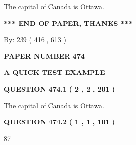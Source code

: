\documentclass[12pt]{article}
\begin{document}
 
\noindent{}
 
 
The capital of Canada is Ottawa.
 
 
 
 
   
   
 \vspace{0.2in}
 
   
   
   
   
\vspace{1.0in} 
{\textbf{\large{ *** END OF PAPER, THANKS *** }}} 
   
   
\hspace{1.0in} By: 
 239 ( 416 ,  613 )
   
   
   
   
\newpage 
\setcounter{page}{ 
   474001 } 
   
   
   
   
 {\textbf{ \Large{ PAPER NUMBER  474  }}}
   
   
\vspace{0.2in}
   
   
   
   
   
   
 \vspace{0.2in}
{\LARGE {\textbf{ A QUICK TEST EXAMPLE}}}
   
   
  
\vspace{0.2in}
  
{\textbf{\Large{QUESTION
474.1 
 ( 2 , 2 , 201 )
}}}
  
  
 
 
\noindent{}
 
 
The capital of Canada is Ottawa.
 
 
 
 
  
\vspace{0.2in}
  
{\textbf{\Large{QUESTION
474.2 
 ( 1 , 1 , 101 )
}}}
  
  
 
 
\noindent{}

87
 
\end{document}
